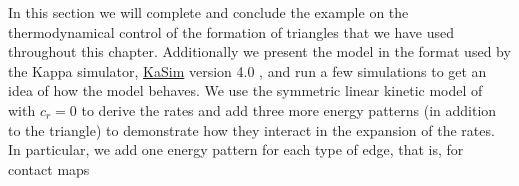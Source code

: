 In this section we will complete and conclude the example
on the thermodynamical control of the formation of triangles
that we have used throughout this chapter.
Additionally we present the model in the format
used by the Kappa simulator, %
\href{https://github.com/Kappa-Dev/KaSim}{KaSim}
version 4.0
\citep{KaSimManual2014},
and run a few simulations to get an idea
of how the model behaves.
We use the symmetric linear kinetic model of 
with $c_r = 0$ to derive the rates
and add three more energy patterns
(in addition to the triangle)
to demonstrate how they interact in the expansion of the rates.
In particular, we add one energy pattern for each type of edge,
that is, for contact maps
\begin{center}
\end{center}


